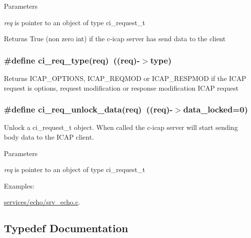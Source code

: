 \begin{DoxyParams}{Parameters}
\item[{\em req}]is pointer to an object of type ci\_\-request\_\-t \end{DoxyParams}
\begin{DoxyReturn}{Returns}
True (non zero int) if the c-\/icap server has send data to the client 
\end{DoxyReturn}
\hypertarget{group__REQUEST_ga513b0e67c47d0a33b9d0e48080c796b2}{
\subsubsection[{ci\_\-req\_\-type}]{\setlength{\rightskip}{0pt plus 5cm}\#define ci\_\-req\_\-type(req)~((req)-\/$>$type)}}
\label{group__REQUEST_ga513b0e67c47d0a33b9d0e48080c796b2}
\begin{DoxyReturn}{Returns}
ICAP\_\-OPTIONS, ICAP\_\-REQMOD or ICAP\_\-RESPMOD if the ICAP request is options, request modification or response modification ICAP request 
\end{DoxyReturn}
\hypertarget{group__REQUEST_ga7d6685cf10deb060690da7f17020634e}{
\subsubsection[{ci\_\-req\_\-unlock\_\-data}]{\setlength{\rightskip}{0pt plus 5cm}\#define ci\_\-req\_\-unlock\_\-data(req)~((req)-\/$>$data\_\-locked=0)}}
\label{group__REQUEST_ga7d6685cf10deb060690da7f17020634e}


Unlock a ci\_\-request\_\-t object. When called the c-\/icap server will start sending body data to the ICAP client. 
\begin{DoxyParams}{Parameters}
\item[{\em req}]is pointer to an object of type ci\_\-request\_\-t \end{DoxyParams}
\begin{Desc}
\item[Examples: ]\par
\hyperlink{services_2echo_2srv__echo_8c-example}{services/echo/srv\_\-echo.c}.\end{Desc}


\subsection{Typedef Documentation}
\hypertarget{group__REQUEST_ga27da5c4ae491f527ce36901c2e78ea04}{
\subsubsection[{ci\_\-request\_\-t}]{}}
\label{group__REQUEST_ga27da5c4ae491f527ce36901c2e78ea04}


